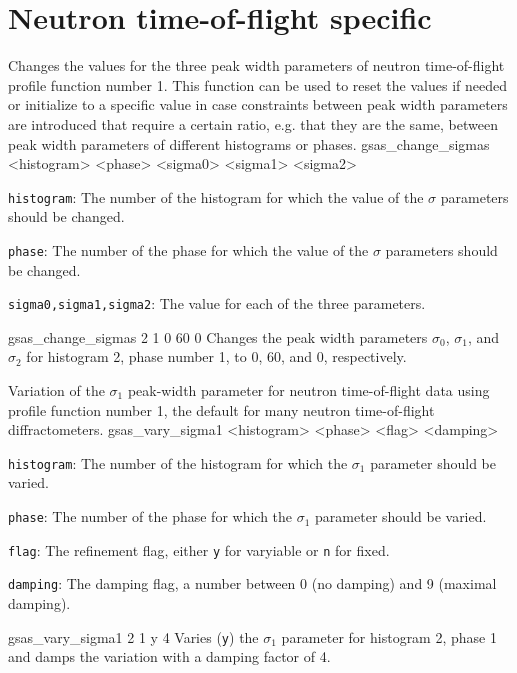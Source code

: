 \section{Neutron time-of-flight specific}

{
Changes the values for the three peak width parameters of neutron time-of-flight profile function number 1. This function can be used to reset the values if needed or initialize to a specific value in case constraints between peak width parameters are introduced that require a certain ratio, e.g. that they are the same, between peak width parameters of different histograms or phases.
}{
gsas\_change\_sigmas <histogram> <phase> <sigma0> <sigma1> <sigma2>
}{
\item \texttt{histogram}: The number of the histogram for which the value of the $\sigma$ parameters should be changed.
\item \texttt{phase}: The number of the phase for which the value of the $\sigma$ parameters should be changed.
\item \texttt{sigma0,sigma1,sigma2}: The value for each of the three parameters.
}{
gsas\_change\_sigmas 2 1 0 60 0
}{
Changes the peak width parameters $\sigma_0$, $\sigma_1$, and $\sigma_2$ for histogram 2, phase number 1, to 0, 60, and 0, respectively.
}

{
Variation of the $\sigma_1$ peak-width parameter for neutron time-of-flight data using profile function number 1, the default for many neutron time-of-flight diffractometers.
}{
gsas\_vary\_sigma1 <histogram> <phase> <flag> <damping>
}{
\item \texttt{histogram}: The number of the histogram for which the $\sigma_1$ parameter should be varied.
\item \texttt{phase}: The number of the phase for which the $\sigma_1$ parameter should be varied.
\item \texttt{flag}: The refinement flag, either \texttt{y} for varyiable or \texttt{n} for fixed.
\item \texttt{damping}: The damping flag, a number between 0 (no damping) and 9 (maximal damping).
}{
gsas\_vary\_sigma1 2 1 y 4
}{
Varies (\texttt{y}) the $\sigma_1$ parameter for histogram 2, phase 1 and damps the variation with a damping factor of 4.
}

